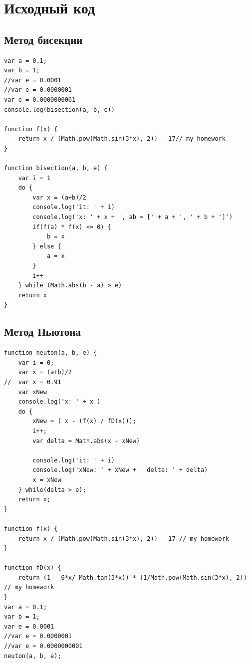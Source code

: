 \documentclass{article}
\begin{document}
\section{Исходный код}
\subsection{Метод бисекции}
\begin{lstlisting}
var a = 0.1;
var b = 1;
//var e = 0.0001
//var e = 0.0000001
var e = 0.0000000001
console.log(bisection(a, b, e))

function f(x) {
	return x / (Math.pow(Math.sin(3*x), 2)) - 17// my homework
}

function bisection(a, b, e) {
	var i = 1
	do {
		var x = (a+b)/2
		console.log('it: ' + i)
		console.log('x: ' + x + ', ab = [' + a + ', ' + b + ']')
		if(f(a) * f(x) <= 0) {
			b = x
		} else {
			a = x
		}
		i++
	} while (Math.abs(b - a) > e)
	return x
}
\end{lstlisting}


\subsection{Метод Ньютона}
\begin{lstlisting}
function neuton(a, b, e) {
	var i = 0;
	var x = (a+b)/2
//	var x = 0.91
	var xNew
	console.log('x: ' + x )
	do {
		xNew = ( x - (f(x) / fD(x)));
		i++;
		var delta = Math.abs(x - xNew)

		console.log('it: ' + i)
		console.log('xNew: ' + xNew +'  delta: ' + delta)
		x = xNew
	} while(delta > e);
	return x;
}

function f(x) {
	return x / (Math.pow(Math.sin(3*x), 2)) - 17 // my homework
}

function fD(x) {
	return (1 - 6*x/ Math.tan(3*x)) * (1/Math.pow(Math.sin(3*x), 2)) // my homework
}
var a = 0.1;
var b = 1;
var e = 0.0001
//var e = 0.0000001
//var e = 0.0000000001
neuton(a, b, e);

\end{lstlisting}
\end{document}

